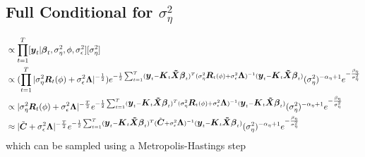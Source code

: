 \documentclass[fleqn]{article}
\def\bm#1{\mbox{\boldmath $#1$}}
\begin{document}
\subsection{Full Conditional for $\sigma^2_\eta$}
%
\begin{align*}
[\sigma^2_\eta | \cdot] & \propto \prod_{t = 1}^T [\bm{y}_t | \bm{\beta}_t, \sigma^2_\eta, \phi, \sigma^2_\epsilon] [\sigma^2_\eta]\\
%
& \propto (\prod_{t = 1}^T |\sigma^2_\eta \bm{R}_t(\phi) + \sigma^2_\epsilon \bm{\Lambda} |^{ - \frac{1} {2}}) e^{ - \frac{1} {2} \sum_{t = 1}^T (\bm{y}_t - \bm{K}_t \bm{\tilde{X}} \bm{\beta}_t)^T (\sigma^2_\eta \bm{R}_t(\phi) + \sigma^2_\epsilon \bm{\Lambda})^{ - 1} (\bm{y}_t - \bm{K}_t \bm{\tilde{X}} \bm{\beta}_t)} (\sigma^2_\eta)^{ - \alpha_\eta + 1} e^{ - \frac{\beta_\eta} {\sigma^2_\eta}}\\
%
& \propto |\sigma^2_\eta \bm{R}_t(\phi) + \sigma^2_\epsilon \bm{\Lambda} |^{ - \frac{T} {2}} e^{ - \frac{1} {2} \sum_{t = 1}^T (\bm{y}_t - \bm{K}_t \bm{\tilde{X}} \bm{\beta}_t)^T (\sigma^2_\eta \bm{R}_t(\phi) + \sigma^2_\epsilon \bm{\Lambda})^{ - 1} (\bm{y}_t - \bm{K}_t \bm{\tilde{X}} \bm{\beta}_t)} (\sigma^2_\eta)^{ - \alpha_\eta + 1} e^{ - \frac{\beta_\eta} {\sigma^2_\eta}}\\
%
& \approx |\tilde{\bm{C}} + \sigma^2_\epsilon \bm{\Lambda} |^{ - \frac{T} {2}} e^{ - \frac{1} {2} \sum_{t = 1}^T (\bm{y}_t - \bm{K}_t \bm{\tilde{X}} \bm{\beta}_t)^T (\tilde{\bm{C}} + \sigma^2_\epsilon \bm{\Lambda})^{ - 1} (\bm{y}_t - \bm{K}_t \bm{\tilde{X}} \bm{\beta}_t)} (\sigma^2_\eta)^{ - \alpha_\eta + 1} e^{ - \frac{\beta_\eta} {\sigma^2_\eta}}
\end{align*}
% 
which can be sampled using a Metropolis-Hastings step
%
\end{document}
